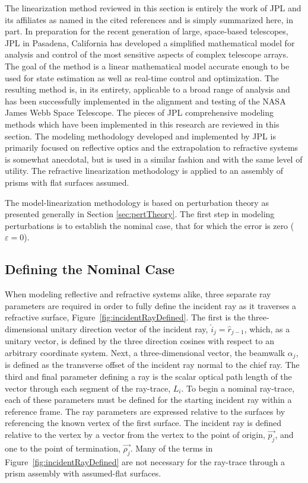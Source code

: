 The linearization method reviewed in this section is entirely the work of \ac{JPL} and its affiliates as named in the cited references and is simply summarized here, in part. In preparation for the recent generation of large, space-based telescopes, \ac{JPL} in Pasadena, California has developed a simplified mathematical model for analysis and control of the most sensitive aspects of complex telescope arrays. The goal of the method is a linear mathematical model accurate enough to be used for state estimation as well as real-time control and optimization. The resulting method is, in its entirety, applicable to a broad range of analysis and has been successfully implemented in the alignment and testing of the \ac{NASA} James Webb Space Telescope. The pieces of \ac{JPL} comprehensive modeling methods which have been implemented in this research are reviewed in this section. The modeling methodology developed and implemented by \ac{JPL} is primarily focused on reflective optics and the extrapolation to refractive systems is somewhat anecdotal, but is used in a similar fashion and with the same level of utility. The refractive linearization methodology is applied to an assembly of prisms with flat surfaces assumed. 

The model-linearization methodology is based on perturbation theory as presented generally in Section \ref{sec:pertTheory}. The first step in modeling perturbations is to establish the nominal case, that for which the error is zero ($\varepsilon = 0$). 

\subsection{Defining the Nominal Case}
\label{sec:nominalCase}

When modeling reflective and refractive systems alike, three separate ray parameters are required in order to fully define the incident ray as it traverses a refractive surface, Figure~\ref{fig:incidentRayDefined}. The first is the three-dimensional unitary direction vector of the incident ray, $\hat{i}_j = \hat{r}_{j-1}$, which, as a unitary vector, is defined by the three direction cosines with respect to an arbitrary coordinate system. Next, a three-dimensional vector, the beamwalk $\alpha_j$, is defined as the transverse offset of the incident ray normal to the chief ray. The third and final parameter defining a ray is the scalar optical path length of the vector through each segment of the ray-trace, $L_i$. To begin a nominal ray-trace, each of these parameters must be defined for the starting incident ray within a reference frame. The ray parameters are expressed relative to the surfaces by referencing the known vertex of the first surface. The incident ray is defined relative to the vertex by a vector from the vertex to the point of origin, $\vec{p_j}$, and one to the point of termination, $\vec{\rho_j}$. Many of the terms in Figure~\ref{fig:incidentRayDefined} are not necessary for the ray-trace through a prism assembly with assumed-flat surfaces.

